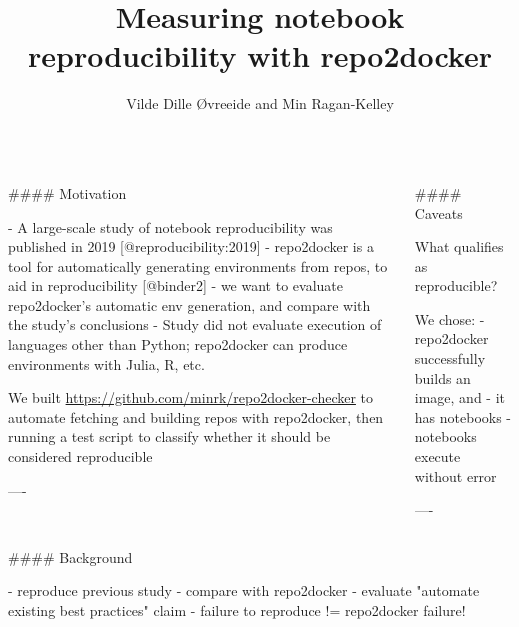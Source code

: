 \documentclass{beamer}
\author[]{Vilde Dille Øvreeide and Min Ragan-Kelley}
\institute[simula]{Simula Research Laboratory}
\title{Measuring notebook reproducibility with repo2docker}
\begin{document}
\begin{frame}[fragile]\centering

\begin{columns}
\begin{column}{0.57\textwidth}

\begin{markdown}

#### Motivation


- A large-scale study of notebook reproducibility was published in 2019 [@reproducibility:2019]
- repo2docker is a tool for automatically generating environments from repos, to aid in reproducibility [@binder2]
- we want to evaluate repo2docker's automatic env generation,
  and compare with the study's conclusions
- Study did not evaluate execution of languages other than Python;
  repo2docker can produce environments with Julia, R, etc.

We built \url{https://github.com/minrk/repo2docker-checker} to automate
fetching and building repos with repo2docker, then running a test script
to classify whether it should be considered reproducible


----
\end{markdown}
\end{column}

\begin{column}{.4\textwidth}
\begin{markdown}


#### Caveats


What qualifies as reproducible?

We chose:
- repo2docker successfully builds an image, and
    - it has notebooks
    - notebooks execute without error

----
\end{markdown}
\end{column}

\end{columns}

\bigskip
{\hrulefill}
\bigskip

\begin{columns}[T]

\begin{column}{.46\textwidth}

\begin{markdown}

#### Background

- reproduce previous study
- compare with repo2docker
- evaluate "automate existing best practices" claim
- failure to reproduce != repo2docker failure!


\end{markdown}
\end{column}
\end{columns}
\end{frame}
\end{document}
